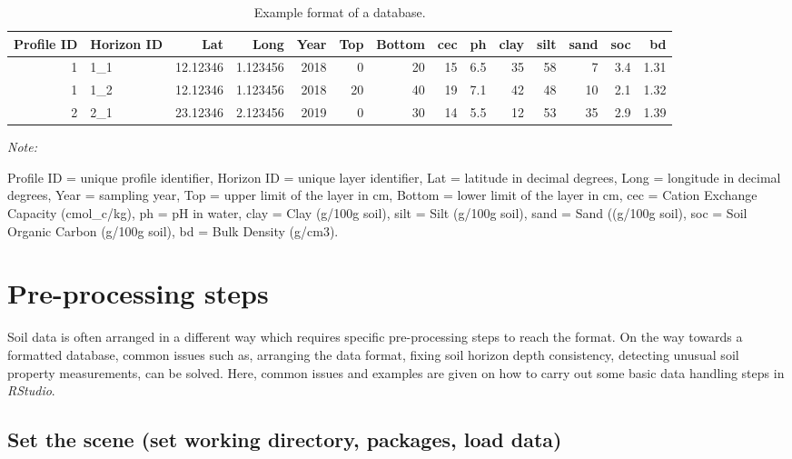 \documentclass[
  10pt,
  b5paper,
  oneside]{book}
\begin{document}
\begin{table}

\caption{\label{tab:data1}Example format of a database.}
\centering
\begin{threeparttable}
\fontsize{5}{7}\selectfont
\begin{tabular}[t]{rlrrrrrrrrrrrr}
\toprule
Profile ID & Horizon ID & Lat & Long & Year & Top & Bottom & cec & ph & clay & silt & sand & soc & bd\\
\midrule
1 & 1\_1 & 12.12346 & 1.123456 & 2018 & 0 & 20 & 15 & 6.5 & 35 & 58 & 7 & 3.4 & 1.31\\
1 & 1\_2 & 12.12346 & 1.123456 & 2018 & 20 & 40 & 19 & 7.1 & 42 & 48 & 10 & 2.1 & 1.32\\
2 & 2\_1 & 23.12346 & 2.123456 & 2019 & 0 & 30 & 14 & 5.5 & 12 & 53 & 35 & 2.9 & 1.39\\
\bottomrule
\end{tabular}
\begin{tablenotes}
\item \textit{Note: } 
\item Profile ID = unique profile identifier, Horizon ID = unique layer identifier, Lat = latitude in decimal degrees, Long = longitude in decimal degrees, Year = sampling year, Top = upper limit of the layer in cm, Bottom = lower limit of the layer in cm, cec = Cation Exchange Capacity (cmol\_c/kg), ph = pH in water, clay = Clay (g/100g soil), silt = Silt (g/100g soil), sand = Sand ((g/100g soil), soc = Soil Organic Carbon (g/100g soil), bd = Bulk Density (g/cm3).
\end{tablenotes}
\end{threeparttable}
\end{table}

\hypertarget{pre-processing-steps}{%
\section{Pre-processing steps}\label{pre-processing-steps}}

Soil data is often arranged in a different way which requires specific pre-processing steps to reach the format. On the way towards a formatted database, common issues such as, arranging the data format, fixing soil horizon depth consistency, detecting unusual soil property measurements, can be solved. Here, common issues and examples are given on how to carry out some basic data handling steps in \emph{RStudio}.

\hypertarget{set-the-scene-set-working-directory-packages-load-data}{%
\subsection{Set the scene (set working directory, packages, load data)}\label{set-the-scene-set-working-directory-packages-load-data}}
\end{document}
